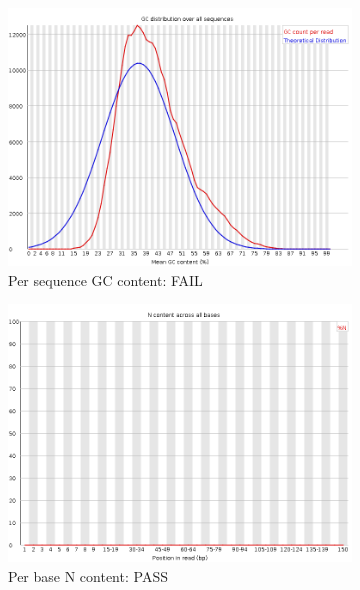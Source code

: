 \documentclass{article}
\begin{document}
\begin{figure}[htbp]
\ContinuedFloat
\centering
\begin{subfigure}{0.45\linewidth}
\includegraphics[width=\linewidth]{04-R1.qfilter_fastqc/Images/per_sequence_gc_content.png}
\caption{Per sequence GC content: FAIL}
\end{subfigure}
\begin{subfigure}{0.45\linewidth}
\includegraphics[width=\linewidth]{04-R1.qfilter_fastqc/Images/per_base_n_content.png}
\caption{Per base N content: PASS}
\end{subfigure}
\begin{subfigure}{0.45\linewidth}

\end{subfigure}
\end{figure}
\end{document}
